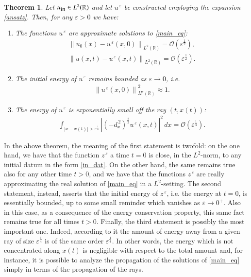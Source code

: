 \documentclass[10pt]{article}
\newtheorem{theorem}{Theorem}[section]
\newcommand{\norm}[2]{{\left\|#1\right\|}_{#2}}
\newcommand{\ffl}[2]{(-d_x^{\,2})^{#1}#2}
\newcommand{\ue}[1]{#1^{\,\varepsilon}}
\newcommand{\RR}{\mathbb{R}}
\newcommand{\uin}{u_{\textrm{\small in}}}
\begin{document}
\begin{theorem}\label{loc_thm}
Let $\uin\in L^2(\RR)$ and let $\ue{u}$ be constructed employing the expansion \eqref{ansatz}. Then, for any $\varepsilon>0$ we have:
\begin{enumerate}
	\item The functions $\ue{u}$ are approximate solutions to \eqref{main_eq}:
	\begin{align*}
		\norm{u_0(x)-\ue{u}(x,0)}{L^2(\RR)} = \mathcal{O}(\varepsilon^{\frac{1}{2}}),
	\end{align*}
	\begin{align*}
		\norm{u(x,t)-\ue{u}(x,t)}{L^2(\RR)} = \mathcal{O}(\varepsilon^{\frac 12}).
	\end{align*}
	\item The initial energy of $\ue{u}$ remains bounded as $\varepsilon\to 0$, i.e.
	\begin{align*}
		\norm{\ue{u}(x,0)}{H^s(\RR)}^2 \approx 1.
	\end{align*}
	\item The energy of $\ue{u}$ is exponentially small off the ray $(t,x(t))$:
	\begin{align*}
		\int_{|x-x(t)|>\varepsilon^{\frac 14}} \left|\ffl{\frac s2}{\ue{u}}(x,t)\right|^2\,dx = \mathcal O(\varepsilon^{\frac 14}).
	\end{align*}	
\end{enumerate}
\end{theorem} 

In the above theorem, the meaning of the first statement is twofold: on the one hand, we have that the function $\ue{z}$ a time $t=0$ is close, in the $L^2$-norm, to any initial datum in the form \eqref{in_dat}. On the other hand, the same remains true also for any other time $t>0$, and we have that the functions $\ue{z}$ are really approximating the real solution of \eqref{main_eq} in a $L^2$-setting.
The second statement, instead, asserts that the initial energy of $\ue{z}$, i.e. the energy at $t=0$, is essentially bounded, up to some small reminder which vanishes as $\varepsilon\to 0^+$. Also in this case, as a consequence of the energy conservation property, this same fact remains true for all times $t>0$. Finally, the third statement is possibly the most important one. Indeed, according to it the amount of energy away from a given ray of size $\varepsilon^{\frac 14}$ is of the same order $\varepsilon^{\frac 14}$. In other words, the energy which is not concentrated along $x(t)$ is negligible with respect to the total amount and, for instance, it is possible to analyze the propagation of the solutions of \eqref{main_eq} simply in terms of the propagation of the rays. 
\end{document}
